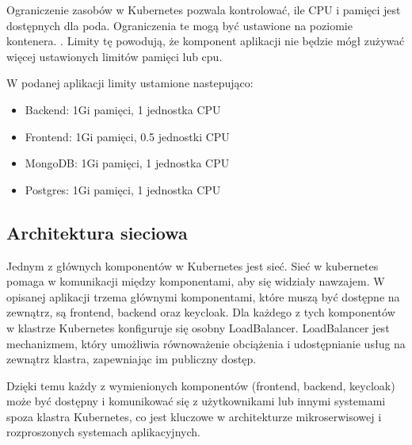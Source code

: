 \documentclass[12pt,a4paper]{article}
\begin{document}

Ograniczenie zasobów w Kubernetes pozwala kontrolować, ile CPU i pamięci jest dostępnych dla poda. Ograniczenia te mogą być ustawione na poziomie kontenera. \cite{stepik}. Limity tę powodują, że komponent aplikacji nie będzie mógł zużywać więcej ustawionych limitów pamięci lub cpu.

W podanej aplikacji limity ustamione nastepująco:

\begin{itemize}
    \item Backend: 1Gi pamięci, 1 jednostka CPU
    \item Frontend: 1Gi pamięci, 0.5 jednostki CPU
    \item MongoDB: 1Gi pamięci, 1 jednostka CPU
    \item Postgres: 1Gi pamięci, 1 jednostka CPU
\end{itemize}


\subsection{Architektura sieciowa}
\label{sec:ExampleResults}


Jednym z głównych komponentów w Kubernetes jest sieć. Sieć w kubernetes pomaga w komunikacji między komponentami, aby się widziały nawzajem. W opisanej aplikacji trzema głównymi komponentami, które muszą być dostępne na zewnątrz, są frontend, backend oraz keycloak. Dla każdego z tych komponentów w klastrze Kubernetes konfiguruje się osobny LoadBalancer. LoadBalancer jest mechanizmem, który umożliwia równoważenie obciążenia i udostępnianie usług na zewnątrz klastra, zapewniając im publiczny dostęp.

Dzięki temu każdy z wymienionych komponentów (frontend, backend, keycloak) może być dostępny i komunikować się z użytkownikami lub innymi systemami spoza klastra Kubernetes, co jest kluczowe w architekturze mikroserwisowej i rozproszonych systemach aplikacyjnych.
\newpage



\nocite{*}
\end{document}
